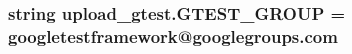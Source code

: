 \subsubsection[{\texorpdfstring{G\+T\+E\+S\+T\+\_\+\+G\+R\+O\+UP}{GTEST_GROUP}}]{\setlength{\rightskip}{0pt plus 5cm}string upload\+\_\+gtest.\+G\+T\+E\+S\+T\+\_\+\+G\+R\+O\+UP = \textquotesingle{}googletestframework@googlegroups.\+com\textquotesingle{}}\hypertarget{namespaceupload__gtest_af282f4c60bf6069ed0abf4e06d9b70ab}{}\label{namespaceupload__gtest_af282f4c60bf6069ed0abf4e06d9b70ab}
